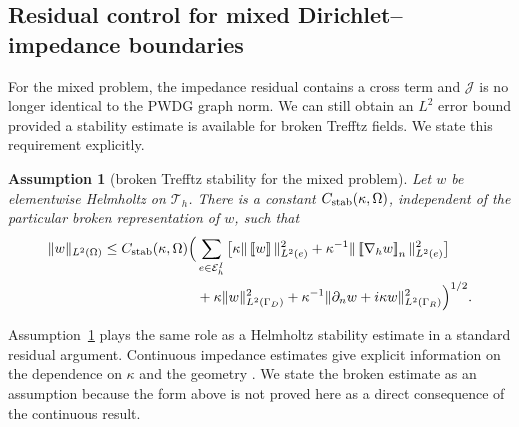 \documentclass[pdflatex,sn-mathphys-num]{sn-jnl}
\theoremstyle{thmstyleone}
\theoremstyle{thmstyletwo}
\newtheorem{assumption}[theorem]{Assumption}
\newcommand{\jump}[1]{\left[\!\left[#1\right]\!\right]}
\newcommand{\jumpn}[1]{\left[\!\left[#1\right]\!\right]_{n}}
\begin{document}
\subsection{Residual control for mixed Dirichlet--impedance boundaries}\label{subsec:mixed-control}
For the mixed problem, the impedance residual contains a cross term and $\mathcal J$ is no longer identical to the PWDG graph norm.  We can still obtain an $L^2$ error bound provided a stability estimate is available for broken Trefftz fields.  We state this requirement explicitly.

\begin{assumption}[broken Trefftz stability for the mixed problem]\label{ass:mixed-stability}
Let $w$ be elementwise Helmholtz on $\mathcal T_h$.  There is a constant $C_{\rm stab}(\kappa,\Omega)$, independent of the particular broken representation of $w$, such that
\begin{equation}\label{eq:mixed-stability}
\begin{aligned}
 \|w\|_{L^2(\Omega)} \le C_{\rm stab}(\kappa,\Omega)\Big(&
 \sum_{e\in\mathcal E_h^I}\big[\kappa\|\jump{w}\|_{L^2(e)}^2
 +\kappa^{-1}\|\jumpn{\nabla_h w}\|_{L^2(e)}^2\big]\\
 &+\kappa\|w\|_{L^2(\Gamma_D)}^2
 +\kappa^{-1}\|\partial_n w+i\kappa w\|_{L^2(\Gamma_R)}^2\Big)^{1/2}.
\end{aligned}
\end{equation}
\end{assumption}
Assumption~\ref{ass:mixed-stability} plays the same role as a Helmholtz stability estimate in a standard residual argument.  Continuous impedance estimates give explicit information on the dependence on $\kappa$ and the geometry \cite{BaskinSpenceWunsch2016}.  We state the broken estimate as an assumption because the form above is not proved here as a direct consequence of the continuous result.
\end{document}
